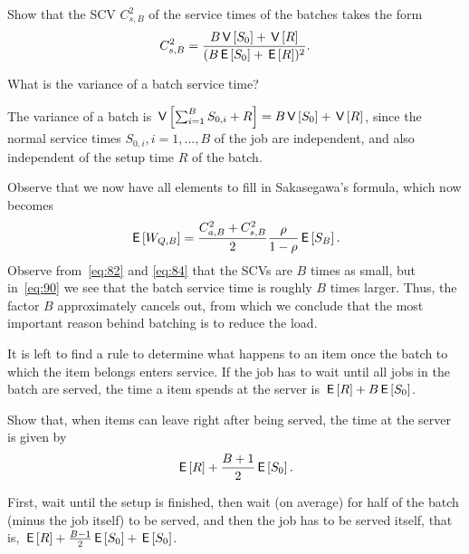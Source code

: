 \begin{exercise}
Show that the SCV $C_{s,B}^2$ of the service times of the batches takes the form
\begin{equation}\label{eq:84}
C_{s, B}^2 = \frac{B \,\mathsf{V}\left[S_0\right] + \,\mathsf{V}\left[R\right]}{(B \,\mathsf{E}\left[S_0\right] + \,\mathsf{E}\left[R\right])^2}.
\end{equation}
\begin{hint}
 What is the variance of a batch service time?
\end{hint}
\begin{solution}
 The variance of a batch is $\,\mathsf{V}\left[\sum_{i=1}^B S_{0,i} + R\right] = B\,\mathsf{V}\left[S_0\right] + \,\mathsf{V}\left[R\right]$, since the normal service times $S_{0,i}, i=1,\ldots, B$ of the job are independent, and also independent of the setup time $R$ of the batch.
\end{solution}
\end{exercise}

Observe that we now have all elements to fill in Sakasegawa's formula, which now becomes
\begin{equation*}
  \,\mathsf{E}\left[W_{Q,B}\right] = \frac{C_{a,B}^2 + C_{s,B}^2}2 \frac \rho{1-\rho} \,\mathsf{E}\left[S_B\right].
\end{equation*}
Observe from~\cref{eq:82} and \cref{eq:84} that the SCVs are $B$ times as small, but in~\cref{eq:90} we see that the batch service time is roughly $B$ times larger.
Thus, the factor $B$ approximately cancels out, from which we conclude that the most important reason behind batching is to reduce the load.

It is left to find a rule to determine what happens to an item once the batch to which the item belongs enters service.
If the job has to wait until all jobs in the batch are served, the time a item spends at the server is $\,\mathsf{E}\left[R\right] + B \,\mathsf{E}\left[S_0\right]$.


\begin{exercise}
Show that, when items can leave right after being served, the time at the server is given by
\begin{equation}\label{eq:85}
\,\mathsf{E}\left[R\right] + \frac{B+1}{2}\,\mathsf{E}\left[S_0\right].
\end{equation}
\begin{solution}
 First, wait until the setup is finished, then wait (on average) for half of the batch (minus the job itself) to be served, and then the job has to be served itself, that is,
$\,\mathsf{E}\left[R\right] + \frac{B-1}{2}\,\mathsf{E}\left[S_0\right] +\,\mathsf{E}\left[S_0\right]$.
\end{solution}
\end{exercise}


